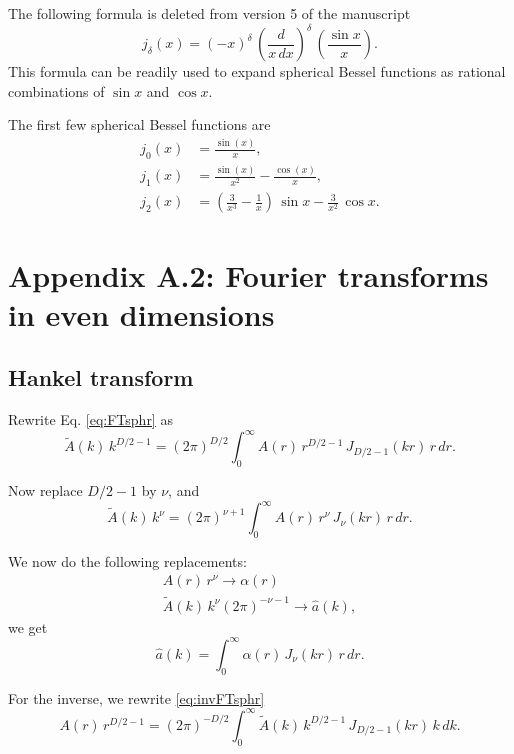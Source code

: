\documentclass[preprint]{revtex4-1}
\numberwithin{equation}{subsection}
\numberwithin{table}{section}
\begin{document}
The following formula is deleted from version 5 of the manuscript
\begin{equation}
  j_\delta(x)
=
  (-x)^\delta \,
  \left(
    \frac{ d }
    { x \, dx }
  \right)^\delta
  \,
  \left(
    \frac{ \sin x } { x }
  \right).
\end{equation}
This formula can be readily used to expand
spherical Bessel functions
as rational combinations of $\sin x$ and $\cos x$.

The first few spherical Bessel functions are
\begin{align*}
  j_0(x)
&=
  \frac{ \sin(x) } { x },
\\
  j_1(x)
&=
  \frac{ \sin(x) } { x^2 }
-
  \frac{ \cos(x) } { x },
\\
  j_2(x)
&=
  \left(
    \frac{ 3 } { x^3 }
    -
    \frac{ 1 } { x }
  \right)
  \,
  \sin x
  -
  \frac{ 3 } { x^2 }
  \,
  \cos x.
\end{align*}



\section{Appendix A.2: Fourier transforms in even dimensions}

\subsection{Hankel transform}

Rewrite Eq. \eqref{eq:FTsphr} as
\[
\tilde{A}(k) \, k^{D/2-1}
= (2 \pi)^{D/2}
\int_0^\infty A(r) \, r^{D/2-1} \, J_{D/2-1}(kr) \, r \, dr.
\]

Now replace $D/2 - 1$ by $\nu$, and
\[
\tilde{A}(k) \, k^\nu
= (2 \pi)^{\nu+1}
\int_0^\infty A(r) \, r^\nu \, J_{\nu}(kr) \, r \, dr.
\]

We now do the following replacements:
\begin{equation}
\begin{split}
  A(r) \, r^\nu \rightarrow \alpha(r) \\
  \tilde{A}(k) \, k^\nu (2\pi)^{-\nu-1}
  \rightarrow
  \hat a(k),
\end{split}
\label{eq:Atoalpha}
\end{equation}
we get
\begin{equation}
\hat a(k)
=
\int_0^\infty \alpha(r) \, J_\nu(kr) \, r \, dr.
\label{eq:HankelTransform}
\end{equation}

For the inverse, we rewrite \eqref{eq:invFTsphr}
\[
A(r) \, r^{D/2-1}
=
(2\pi)^{-D/2}
\int_0^\infty \tilde{A}(k) \, k^{D/2-1} \, J_{D/2-1}(kr) \, k \, dk.
\]
\end{document}
